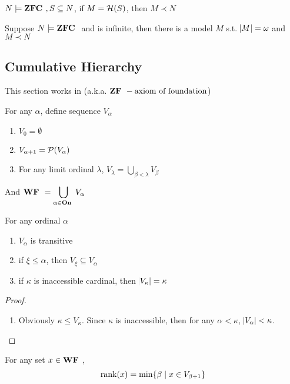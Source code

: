 \documentclass[11pt]{article}
\begin{document}
\begin{lemma}[]
\(N\models\textbf{ZFC },S\subseteq N\), if \(M=\mathcal{H}(S)\), then \(M\prec N\)
\end{lemma}

\begin{theorem}
Suppose \(N\models\textbf{ZFC }\) and is infinite, then there is a model \(M\) s.t.
\(\abs{M}=\omega\) and \(M\prec N\)
\end{theorem}
\subsection{Cumulative Hierarchy}
\label{sec:orgd39a292}
This section works in \zfm(a.k.a. \(\textbf{ZF }-\text{axiom of foundation}\))

\begin{definition}[]
For any \(\alpha\), define sequence \(V_\alpha\)
\begin{enumerate}
\item \(V_0=\emptyset\)
\item \(V_{\alpha+1}=\mathcal{P}(V_\alpha)\)
\item For any limit ordinal \(\lambda\), \(V_\lambda=\bigcup_{\beta<\lambda}V_\beta\)
\end{enumerate}


And \(\textbf{WF }=\displaystyle\bigcup_{\alpha\in\textbf{On }}V_\alpha\)
\end{definition}

\begin{lemma}[]
For any ordinal \(\alpha\)
\begin{enumerate}
\item \(V_\alpha\) is transitive
\item if \(\xi\le\alpha\), then \(V_\xi\subseteq V_\alpha\)
\item if \(\kappa\) is inaccessible cardinal, then \(\abs{V_\kappa}=\kappa\)
\end{enumerate}
\end{lemma}

\begin{proof}
\begin{enumerate}
\item Obviously \(\kappa\le V_\kappa\). Since \(\kappa\) is inaccessible, then for any
\(\alpha<\kappa\), \(\abs{V_\alpha}<\kappa\).
\end{enumerate}
\end{proof}

\begin{definition}[]
For any set \(x\in\textbf{WF }\), 
\begin{equation*}
\text{rank}(x)=\min\{\beta\mid x\in V_{\beta+1}\}
\end{equation*}
\end{definition}
\end{document}
